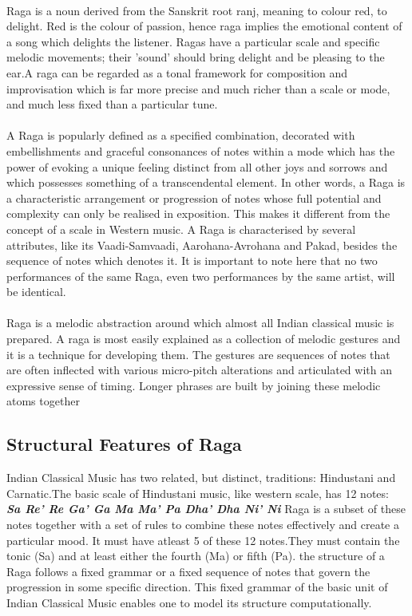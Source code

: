 \documentclass[12pt,a4paper]{article}
\begin{document}
\paragraph{}
Raga is a noun derived from the Sanskrit root ranj, meaning to colour red, to delight. Red is the colour of passion, hence raga implies the emotional content of a song which delights the listener. Ragas have a particular scale and specific melodic movements; their ’sound’ should bring delight and be pleasing to the ear.A raga can be regarded as a tonal framework for composition and improvisation which is far more precise and much richer than a scale or mode, and much less fixed than a particular tune. 
\paragraph{}
A Raga is popularly defined as a specified combination, decorated with embellishments and graceful consonances of notes within a mode which has the power of evoking a unique feeling distinct from all other joys and sorrows and which possesses something of a transcendental element. In other words, a Raga is a characteristic arrangement or progression of notes whose full potential and complexity can only be realised in exposition. This makes it different from the concept of a scale in Western music. A Raga is characterised by several attributes, like its Vaadi-Samvaadi, Aarohana-Avrohana and Pakad, besides the sequence of notes which denotes it. It is important to note here that no two performances of the same Raga, even two performances by the same artist, will be identical. 
\paragraph{}				
 Raga is a melodic abstraction around which almost all Indian classical music is prepared. A raga is most easily explained as a collection of melodic gestures and it is a technique for developing them. The gestures are sequences of notes that are often inflected with various micro-pitch alterations and articulated with an expressive sense of timing. Longer phrases are built by joining these melodic atoms together  

\subsection{Structural Features of Raga}

Indian Classical Music has two related, but distinct, traditions: Hindustani and Carnatic.The basic scale of Hindustani music, like western scale, has 12 notes:\\
{\textbf{\em{Sa Re’ Re Ga’ Ga Ma Ma’ Pa Dha’ Dha Ni’ Ni}}}
		Raga is a subset of these notes together with a set of rules to combine these notes effectively and create a particular mood. It must have atleast 5 of these 12 notes.They must contain the tonic (Sa) and at least either the fourth (Ma) or fifth (Pa). the structure of a Raga follows a fixed grammar or a fixed sequence of notes that govern the progression in some specific direction. This fixed grammar of the basic unit of Indian Classical Music enables one to model its structure computationally. 
\end{document}

